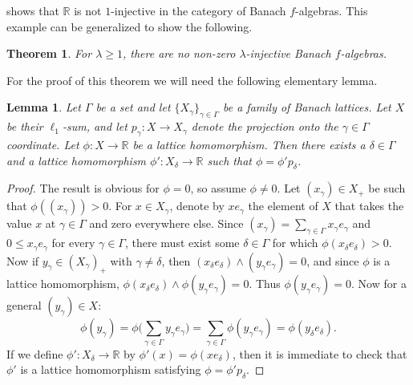 \documentclass{memo-l}
\newtheorem{thm}[theorem]{Theorem}
\newtheorem{lem}[theorem]{Lemma}
\theoremstyle{definition}
\theoremstyle{remark}
\numberwithin{section}{chapter}
\numberwithin{equation}{chapter}
\newcommand\R{\ensuremath{\mathbb{R}}}
\newcommand{\el}[1]{\ensuremath{\ell_{#1}}}
\newcommand{\falg}{$f\!$-algebra}
\begin{document}
 shows that $\R$ is not
$1$-injective in the category of Banach \falg s. This example can be
generalized to show the following.

\begin{thm}\label{thm:no_injectives}
    For $\lambda \ge 1$, there are no non-zero $\lambda $-injective
    Banach \falg s.
\end{thm}

For the proof of this theorem we will need the following
elementary lemma.

\begin{lem}\label{lem:lat_hom_sum}
    Let $\Gamma $ be a set and let $\{X_\gamma \}_{\gamma \in \Gamma
    }$ be a family of Banach lattices. Let $X$ be
    their $\el 1$-sum, and let $p_\gamma \colon X\to X_\gamma $ denote the
    projection onto the $\gamma  \in \Gamma $ coordinate. Let $\phi \colon
     X\to \R$ be a lattice homomorphism. Then there exists a $\delta
     \in \Gamma $ and a lattice homomorphism $\phi '\colon X_\delta
     \to \R$ such that $\phi =\phi ' p_\delta $.
\end{lem}
\begin{proof}
    The result is obvious for $\phi =0$, so assume $\phi \neq 0$. Let
    $(x_\gamma )\in X_+$ be such that $\phi ( (x_\gamma) )>0$. For $x\in X_\gamma$, denote
    by $x e_\gamma $ the element of $X$ that takes the value $x$ at
    $\gamma \in \Gamma $ and zero everywhere else. Since $(x_\gamma
    )=\sum_{\gamma \in \Gamma}^{}x_\gamma e_\gamma $ and $0\le
    x_\gamma e_\gamma $ for every $\gamma \in \Gamma $, there must
    exist some $\delta \in \Gamma $ for which $\phi (x_\delta e_\delta
    )>0$. Now if $y_\gamma \in (X_\gamma )_+$ with $\gamma \neq \delta $, then $(x_\delta
    e_\delta )\wedge (y_\gamma e_\gamma )=0$, and since $\phi $ is a
    lattice homomorphism, $\phi (x_\delta e_\delta )\wedge \phi
    (y_\gamma e_\gamma )=0$. Thus $\phi (y_\gamma e_\gamma )=0$. Now
    for a general $(y_\gamma )\in X$:
    \[
    \phi (y_\gamma )=\phi \bigg( \sum_{\gamma \in \Gamma }^{} y_\gamma
    e_\gamma \bigg) =\sum_{\gamma \in \Gamma }^{} \phi (y_\gamma
    e_\gamma )=\phi (y_\delta e_\delta ).
    \]
    If we define $\phi '\colon X_\delta \to \R$ by $\phi '(x)=\phi (x
    e_\delta )$, then it is immediate to check that $\phi '$ is a
    lattice homomorphism satisfying $\phi =\phi 'p_\delta $.
\end{proof}
\end{document}
